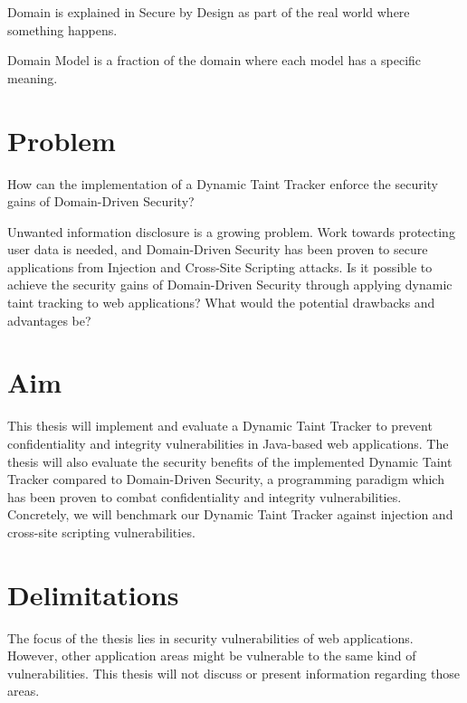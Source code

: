 \begin{definition}{Domain}
    is explained in Secure by Design \parencite{sbd2018} as part of the real world where something happens.
    \\
\end{definition}

\begin{definition}{Domain Model}
    is a fraction of the domain where each model has a specific meaning.
    \\
\end{definition}



\section{Problem}
\label{Problem}


\begin{chapquote}{}
    How can the implementation of a Dynamic Taint Tracker enforce the security gains of Domain-Driven Security?
\end{chapquote}

\noindent
Unwanted information disclosure is a growing problem. Work towards protecting user data is needed, and Domain-Driven Security has been proven to secure applications from Injection and Cross-Site Scripting attacks. Is it possible to achieve the security gains of Domain-Driven Security through applying dynamic taint tracking to web applications? What would the potential drawbacks and advantages be?



\section{Aim}
\label{Aim}
This thesis will implement and evaluate a Dynamic Taint Tracker to prevent confidentiality and integrity vulnerabilities in Java-based web applications. The thesis will also evaluate the security benefits of the implemented Dynamic Taint Tracker compared to Domain-Driven Security, a programming paradigm which has been proven to combat confidentiality and integrity vulnerabilities. Concretely, we will benchmark our Dynamic Taint Tracker against injection and cross-site scripting vulnerabilities.



\section{Delimitations}
\label{Delimitations}
The focus of the thesis lies in security vulnerabilities of web applications. However, other application areas might be vulnerable to the same kind of vulnerabilities.  This thesis will not discuss or present information regarding those areas.

